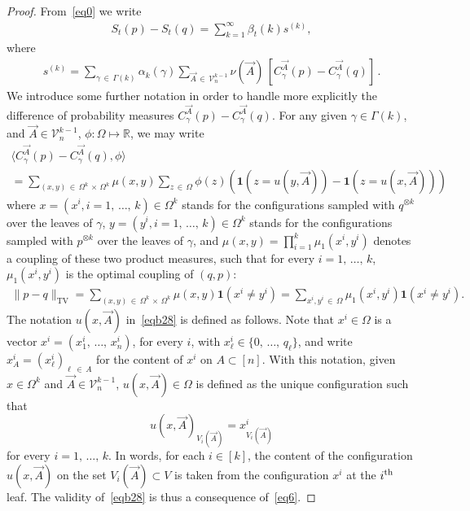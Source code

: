 \documentclass[10pt,a4paper]{article}
\newcommand{\scalar}[2]{\langle #1, #2\rangle}
\newcommand{\tv}{\mathrm{TV}}
\newcommand{\ind}{\mathbf{1}}
\newcommand{\cV}{\mathcal{V}}
\newcommand{\bbR}{\mathbb{R}}
\let\b=\beta
\let\g=\gamma
\let\G=\Gamma
\let\O=\Omega
\begin{document}
\begin{proof}
From~\eqref{eq0} we write
\begin{align}\label{eqb17}
S_t(p) - S_t(q) =\sum_{k=1}^\infty \b_t(k) s^{(k)},
\end{align}
where
\begin{align}\label{eqba17}
s^{(k)}=\sum_{\gamma\,\in\,\Gamma(k)}\alpha_k(\gamma)
\sum_{\vec A\,\in\,\cV_n^{k-1}}\nu(\vec A) \,\left[C^{\vec A}_{\gamma}(p)-C^{\vec A}_{\gamma}(q)\right]\,.
\end{align}
We introduce some further notation in order to handle more explicitly the difference of probability measures $C^{\vec A}_{\gamma}(p)-C^{\vec A}_{\gamma}(q)$. For any given $\g\in\G(k)$, and $\vec A\in \cV_n^{k-1}$, $\phi:\O\mapsto\bbR$, we may write
\begin{multline}\label{eqb28}
\scalar{C^{\vec A}_{\gamma}(p)-C^{\vec A}_{\gamma}(q)}{\phi}\\
 =\sum_{(x,y)\,\in\,\Omega^k\,\times\, \Omega^k}\mu(x,y) \sum_{z\,\in\,\Omega} \phi(z)\left(\ind\left(z=u(y,\vec A)\right)-\ind\left(z=u(x,\vec A)\right)
\right)
\end{multline}
where $x=(x^i,i=1,\,\dots,\,k)\in\O^k$ stands for the configurations sampled with $q^{\otimes k}$ over the leaves of $\g$, $y=(y^i,i=1,\,\dots,\,k)\in\O^k$ stands for the configurations sampled with $p^{\otimes k}$ over the leaves of $\g$, and $\mu(x,y)=\prod_{i=1}^k\mu_1(x^i,y^i)$ denotes a coupling of these two product measures, such that for every $i=1,\,\dots,\,k$, $\mu_1(x^i,y^i)$ is the optimal coupling of $(q,p)$:
\begin{align}\label{eq29}
\|p-q\|_{\tv} = \sum_{(x,y)\,\in\,\Omega^k\,\times\,\Omega^k}\mu(x,y) \ind\left(x^i\neq y^i\right)=\sum_{x^i,y^i\,\in\,\Omega}\mu_1\left(x^i,y^i\right) \ind\left(x^i\neq y^i\right).
\end{align}
The notation $u(x,\vec A)$ in~\eqref{eqb28} is defined as follows. Note that $x^i\in\O$ is a vector $x^i=(x^i_1,\,\dots,\,x^i_n)$, for every $i$, with $x^i_\ell\in\{0,\,\dots,\,q_\ell\}$, and write $x^i_A=(x^i_\ell)_{\ell\,\in\,A}$ for the content of $x^i$ on $A\subset[n]$. With this notation, given $x\in\Omega^k$ and $\vec A\in\cV_n^{k-1}$, $u(x,\vec A)\in\O$ is defined as the unique configuration such that
\[
u(x,\vec A)_{V_i(\vec A)} = x^i_{V_i(\vec A)}
\]
for every $i=1,\,\dots,\,k$. In words, for each $i\in[k]$, the content of the configuration $u(x,\vec A)$ on the set $V_i(\vec A)\subset V$ is taken from the configuration $x^i$ at the $i^{\rm th}$ leaf. The validity of~\eqref{eqb28} is thus a consequence of~\eqref{eq6}.


\end{proof}
\end{document}
